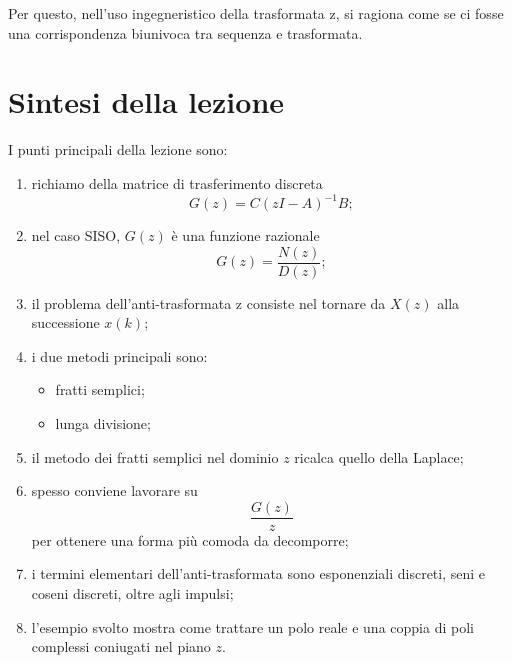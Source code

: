 Per questo, nell'uso ingegneristico della trasformata z,
si ragiona come se ci fosse una corrispondenza biunivoca tra sequenza e trasformata.

\section{Sintesi della lezione}

I punti principali della lezione sono:
\begin{enumerate}
    \item richiamo della matrice di trasferimento discreta
    \[
    G(z)=C(zI-A)^{-1}B;
    \]
    \item nel caso SISO, \(G(z)\) \`e una funzione razionale
    \[
    G(z)=\frac{N(z)}{D(z)};
    \]
    \item il problema dell'anti-trasformata z consiste nel tornare da \(X(z)\)
    alla successione \(x(k)\);
    \item i due metodi principali sono:
    \begin{itemize}
        \item fratti semplici;
        \item lunga divisione;
    \end{itemize}
    \item il metodo dei fratti semplici nel dominio \(z\) ricalca quello della Laplace;
    \item spesso conviene lavorare su
    \[
    \frac{G(z)}{z}
    \]
    per ottenere una forma pi\`u comoda da decomporre;
    \item i termini elementari dell'anti-trasformata sono esponenziali discreti,
    seni e coseni discreti, oltre agli impulsi;
    \item l'esempio svolto mostra come trattare un polo reale e una coppia di poli
    complessi coniugati nel piano \(z\).
\end{enumerate}